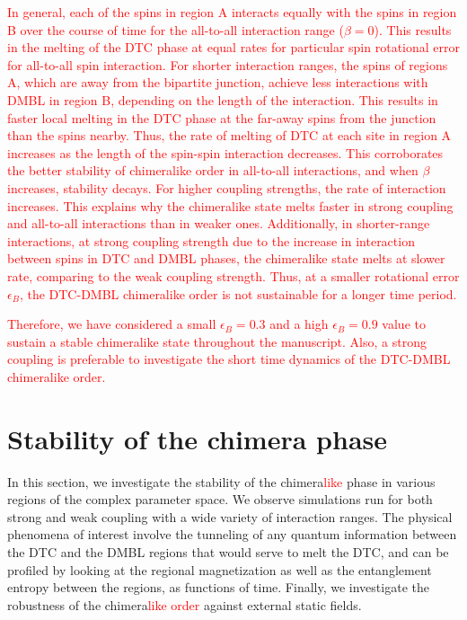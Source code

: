 \documentclass[12pt]{iopart}
\newcommand{\red}[1]{\textcolor{red}{#1}}
\begin{document}
\red{ In general, each of the spins in region A interacts equally with the spins in region B over the course of time for the all-to-all interaction range ($\beta=0$). This results in the melting of the DTC phase at equal rates for particular spin rotational error for all-to-all spin interaction. For shorter interaction ranges, the spins of regions A, which are away from the bipartite junction, achieve less interactions with DMBL in region B, depending on the length of the interaction. This results in faster local melting in the DTC phase at the far-away spins from the junction than the spins nearby. Thus, the rate of melting of DTC at each site in region A increases as the length of the spin-spin interaction decreases. This corroborates the better stability of chimeralike order in all-to-all interactions, and when $\beta$ increases, stability decays. For higher coupling strengths, the rate of interaction increases. This explains why the chimeralike state melts faster in strong coupling and all-to-all interactions than in weaker ones. Additionally, in shorter-range interactions, at strong coupling strength due to the increase in interaction between spins in DTC and DMBL phases, the chimeralike state melts at slower rate, comparing to the weak coupling strength. Thus, at a smaller rotational error $\epsilon_B$, the DTC-DMBL chimeralike order is not sustainable for a longer time period.}

\red{ Therefore, we have considered a small $\epsilon_B = 0.3$ and a high $\epsilon_B = 0.9$ value to sustain a stable chimeralike state throughout the manuscript. Also, a strong coupling is preferable to investigate the short time dynamics of the DTC-DMBL chimeralike order.}

\section{\label{sec:level4} Stability of the chimera phase}
In this section, we investigate the stability of the chimera\red{like} phase in various regions of the complex parameter space. We observe simulations run for both strong and weak coupling with a wide variety of interaction ranges. The physical phenomena of interest involve the tunneling of any quantum information between the DTC and the DMBL regions that would serve to melt the DTC, and can be profiled by looking at the regional magnetization as well as the entanglement entropy between the regions, as functions of time. Finally, we investigate the robustness of the chimera\red{like order} against external static fields.
\end{document}
